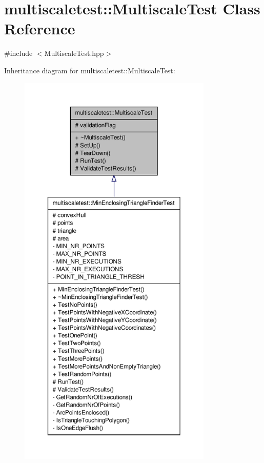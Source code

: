 \hypertarget{classmultiscaletest_1_1MultiscaleTest}{\section{multiscaletest\-:\-:\-Multiscale\-Test \-Class \-Reference}
\label{classmultiscaletest_1_1MultiscaleTest}
}


{\ttfamily \#include $<$\-Multiscale\-Test.\-hpp$>$}



\-Inheritance diagram for multiscaletest\-:\-:\-Multiscale\-Test\-:\nopagebreak
\begin{figure}[H]
\begin{center}
\leavevmode
\includegraphics[height=550pt]{classmultiscaletest_1_1MultiscaleTest__inherit__graph}
\end{center}
\end{figure}
